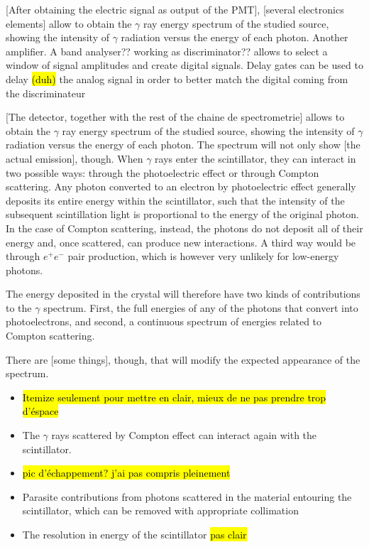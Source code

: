 [After obtaining the electric signal as output of the PMT], [several electronics elements] allow to obtain the $\gamma$ ray energy spectrum of the studied source, 
showing the intensity of $\gamma$ radiation versus the energy of each photon.
Another amplifier.
A band analyser?? working as discriminator?? allows to select a window of signal amplitudes and create digital signals.
Delay gates can be used to delay \hl{(duh)} the analog signal in order to better match the digital coming from the discriminateur

[The detector, together with the rest of the chaine de spectrometrie] allows to obtain the $\gamma$ ray energy spectrum of the studied source, showing the intensity of $\gamma$ radiation versus the energy of each photon.
The spectrum will not only show [the actual emission], though.
When $\gamma$ rays enter the scintillator, they can interact in two possible ways: through the photoelectric effect or through Compton scattering.
Any photon converted to an electron by photoelectric effect generally deposits its entire energy within the scintillator, such that the intensity of the subsequent scintillation light is proportional to the energy of the original photon.
In the case of Compton scattering, instead, the photons do not deposit all of their energy and, once scattered, can produce new interactions.
A third way would be through $e^+ e^-$ pair production, which is however very unlikely for low-energy photons.

The energy deposited in the crystal will therefore have two kinds of contributions to the $\gamma$ spectrum.
First, the full energies of any of the photons that convert into photoelectrons, and second, a continuous spectrum of energies related to Compton scattering.

There are [some things], though, that will modify the expected appearance of the spectrum.
\begin{itemize}
    \item \hl{Itemize seulement pour mettre en clair, mieux de ne pas prendre trop d'éspace}
    \item The $\gamma$ rays scattered by Compton effect can interact again with the scintillator.
    \item \hl{pic d'échappement? j'ai pas compris pleinement}
    \item Parasite contributions from photons scattered in the material entouring the scintillator, which can be removed with appropriate collimation
    \item The resolution in energy of the scintillator \hl{pas clair}
\end{itemize}

